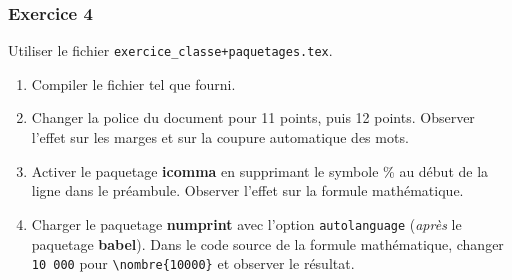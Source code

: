 \begin{frame}[fragile]

\frametitle{Exercice 4}

Utiliser le fichier \texttt{exercice\_classe+paquetages.tex}.

\begin{enumerate}
	\item Compiler le fichier tel que fourni.
	\item Changer la police du document pour 11 points, puis 12 points.
	Observer l’effet sur les marges et sur la coupure automatique
	des mots.
	\item Activer le paquetage \textbf{icomma} en supprimant le symbole \% au
	début de la ligne dans le préambule. Observer l’effet sur la
	formule mathématique.
	\item Charger le paquetage \textbf{numprint} avec l’option \texttt{autolanguage}
	(\emph{après} le paquetage \textbf{babel}). Dans le code source de la formule
	mathématique, changer \texttt{10 000} pour \texttt{\textbackslash nombre\{10000\}}
	et observer le résultat.
\end{enumerate}

\end{frame}